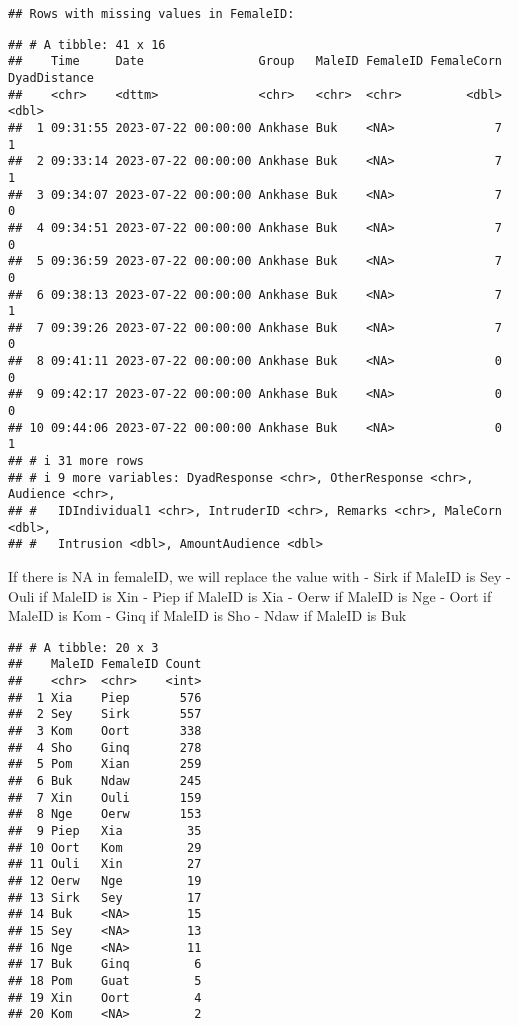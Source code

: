 \documentclass[
]{article}
\begin{document}
\begin{verbatim}
## Rows with missing values in FemaleID:
\end{verbatim}

\begin{verbatim}
## # A tibble: 41 x 16
##    Time     Date                Group   MaleID FemaleID FemaleCorn DyadDistance
##    <chr>    <dttm>              <chr>   <chr>  <chr>         <dbl>        <dbl>
##  1 09:31:55 2023-07-22 00:00:00 Ankhase Buk    <NA>              7            1
##  2 09:33:14 2023-07-22 00:00:00 Ankhase Buk    <NA>              7            1
##  3 09:34:07 2023-07-22 00:00:00 Ankhase Buk    <NA>              7            0
##  4 09:34:51 2023-07-22 00:00:00 Ankhase Buk    <NA>              7            0
##  5 09:36:59 2023-07-22 00:00:00 Ankhase Buk    <NA>              7            0
##  6 09:38:13 2023-07-22 00:00:00 Ankhase Buk    <NA>              7            1
##  7 09:39:26 2023-07-22 00:00:00 Ankhase Buk    <NA>              7            0
##  8 09:41:11 2023-07-22 00:00:00 Ankhase Buk    <NA>              0            0
##  9 09:42:17 2023-07-22 00:00:00 Ankhase Buk    <NA>              0            0
## 10 09:44:06 2023-07-22 00:00:00 Ankhase Buk    <NA>              0            1
## # i 31 more rows
## # i 9 more variables: DyadResponse <chr>, OtherResponse <chr>, Audience <chr>,
## #   IDIndividual1 <chr>, IntruderID <chr>, Remarks <chr>, MaleCorn <dbl>,
## #   Intrusion <dbl>, AmountAudience <dbl>
\end{verbatim}

If there is NA in femaleID, we will replace the value with - Sirk if
MaleID is Sey - Ouli if MaleID is Xin - Piep if MaleID is Xia - Oerw if
MaleID is Nge - Oort if MaleID is Kom - Ginq if MaleID is Sho - Ndaw if
MaleID is Buk

\begin{verbatim}
## # A tibble: 20 x 3
##    MaleID FemaleID Count
##    <chr>  <chr>    <int>
##  1 Xia    Piep       576
##  2 Sey    Sirk       557
##  3 Kom    Oort       338
##  4 Sho    Ginq       278
##  5 Pom    Xian       259
##  6 Buk    Ndaw       245
##  7 Xin    Ouli       159
##  8 Nge    Oerw       153
##  9 Piep   Xia         35
## 10 Oort   Kom         29
## 11 Ouli   Xin         27
## 12 Oerw   Nge         19
## 13 Sirk   Sey         17
## 14 Buk    <NA>        15
## 15 Sey    <NA>        13
## 16 Nge    <NA>        11
## 17 Buk    Ginq         6
## 18 Pom    Guat         5
## 19 Xin    Oort         4
## 20 Kom    <NA>         2
\end{verbatim}
\end{document}
